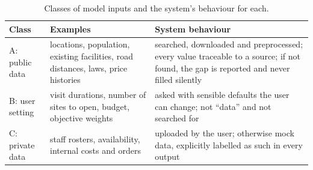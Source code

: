 \begin{table}[t]
\centering
\caption{Classes of model inputs and the system's behaviour for each.}
\label{tab:dataclasses}
\small
\begin{tabular}{@{}lp{4.2cm}p{6.3cm}@{}}
\toprule
Class & Examples & System behaviour \\
\midrule
A: public data & locations, population, existing facilities, road distances, laws, price histories &
  searched, downloaded and preprocessed; every value traceable to a source; if not found, the gap is reported and
  never filled silently \\
B: user setting & visit durations, number of sites to open, budget, objective weights &
  asked with sensible defaults the user can change; not ``data'' and not searched for \\
C: private data & staff rosters, availability, internal costs and orders &
  uploaded by the user; otherwise mock data, explicitly labelled as such in every output \\
\bottomrule
\end{tabular}
\end{table}


